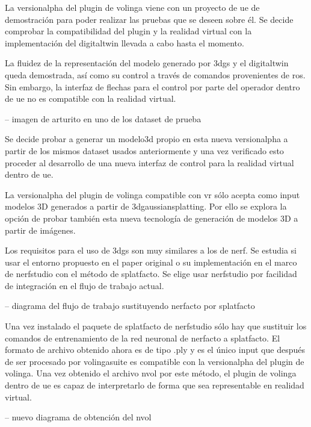 \documentclass[a4paper, 12pt, spanish, twoside]{article}
\begin{document}
La \gls{versionalpha} del \gls{plugin} de \gls{volinga} viene con un proyecto de \acrshort{ue} de demostración para poder realizar las pruebas que se deseen sobre él. Se decide comprobar la compatibilidad del \gls{plugin} y la realidad virtual con la implementación del \gls{digitaltwin} llevada a cabo hasta el momento. 

La fluidez de la representación del modelo generado por \acrshort{3dgs} y el \gls{digitaltwin} queda demostrada, así como su control a través de comandos provenientes de \acrshort{ros}. Sin embargo, la interfaz de flechas para el control por parte del operador dentro de \acrshort{ue} no es compatible con la realidad virtual. 

-- imagen de arturito en uno de los dataset de prueba 

Se decide probar a generar un \gls{modelo3d} propio en esta nueva \gls{versionalpha} a partir de los mismos \gls{dataset} usados anteriormente y una vez verificado esto proceder al desarrollo de una nueva interfaz de control para la realidad virtual dentro de \acrshort{ue}. 

La \gls{versionalpha} del \gls{plugin} de \gls{volinga} compatible con \acrshort{vr} sólo acepta como input modelos 3D generados a partir de \gls{3dgaussiansplatting}. Por ello se explora la opción de probar también esta nueva tecnología de generación de modelos 3D a partir de imágenes. 

Los requisitos para el uso de \acrshort{3dgs} son muy similares a los de \acrshort{nerf}. Se estudia si usar el entorno propuesto en el paper original o su implementación en el marco de \gls{nerfstudio} con el método de \gls{splatfacto}. Se elige usar \gls{nerfstudio} por facilidad de integración en el flujo de trabajo actual. 

-- diagrama del flujo de trabajo sustituyendo nerfacto por splatfacto 

Una vez instalado el paquete de \gls{splatfacto} de \gls{nerfstudio} sólo hay que sustituir los comandos de entrenamiento de la red neuronal de \gls{nerfacto} a \gls{splatfacto}. El formato de archivo obtenido ahora es de tipo .ply y es el único input que después de ser procesado por \gls{volingasuite} es compatible con la \gls{versionalpha} del \gls{plugin} de \gls{volinga}. Una vez obtenido el archivo \gls{nvol} por este método, el \gls{plugin} de \gls{volinga} dentro de \acrshort{ue} es capaz de interpretarlo de forma que sea representable en realidad virtual. 

-- nuevo diagrama de obtención del nvol 
\end{document}
